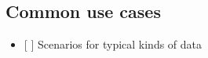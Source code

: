 \subsection{Common use cases}\label{common-use-cases}

\begin{itemize}
\tightlist
\item
  {[} {]} Scenarios for typical kinds of data
\end{itemize}
